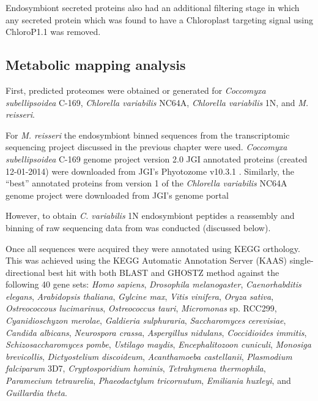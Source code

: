 {{Endosymbiont secreted proteins also had an additional filtering stage in which
any secreted protein which was found to have a Chloroplast targeting signal 
using ChloroP1.1 was removed.


\subsection{Metabolic mapping analysis}

First, predicted proteomes were obtained or generated for
\textit{Coccomyxa subellipsoidea} C-169, \textit{Chlorella variabilis}
NC64A, \textit{Chlorella variabilis} 1N, and \textit{M. reisseri}. 

For \textit{M. reisseri} the endosymbiont binned sequences from the transcriptomic
sequencing project discussed in the previous chapter were used. 
\textit{Coccomyxa subellipsoidea} C-169 genome project \citep{Blanc2012} version 2.0 
JGI annotated proteins (created 12-01-2014) were downloaded from JGI's
Phyotozome v10.3.1 \citep{Goodstein2012}. 
Similarly, the ``best'' annotated proteins from
version 1 of the \textit{Chlorella variabilis} NC64A genome project \citep{Blanc2010}
were downloaded from JGI's genome portal \citep{Grigoriev2011,Nordberg2014}

However, to obtain \textit{C. variabilis} 1N endosymbiont peptides 
a reassembly and binning of raw sequencing data from \citep{Kodama2014}
was conducted (discussed below). 

Once all sequences were acquired they were annotated using KEGG
orthology.  This was achieved 
using the KEGG Automatic Annotation Server (KAAS) \citep{Moriya2007a}
single-directional best hit with both BLAST and GHOSTZ \citep{Suzuki2014,Suzuki2015} 
method against the following 40 gene sets: \textit{Homo sapiens}, 
\textit{Drosophila melanogaster}, \textit{Caenorhabditis elegans},
\textit{Arabidopsis thaliana}, \textit{Gylcine max},
\textit{Vitis vinifera}, \textit{Oryza sativa}, 
\textit{Ostreococcous lucimarinus}, \textit{Ostreococcus tauri},
\textit{Micromonas} sp. RCC299, \textit{Cyanidioschyzon merolae},
\textit{Galdieria sulphuraria}, \textit{Saccharomyces cerevisiae},
\textit{Candida albicans}, \textit{Neurospora crassa}, \textit{Aspergillus nidulans},
\textit{Coccidioides immitis}, \textit{Schizosaccharomyces pombe},
\textit{Ustilago maydis}, \textit{Encephalitozoon cuniculi},
\textit{Monosiga brevicollis}, \textit{Dictyostelium discoideum}, 
\textit{Acanthamoeba castellanii}, \textit{Plasmodium falciparum} 3D7, 
\textit{Cryptosporidium hominis}, \textit{Tetrahymena thermophila},
\textit{Paramecium tetraurelia}, \textit{Phaeodactylum tricornutum},
\textit{Emiliania huxleyi}, and \textit{Guillardia theta}.

}}

